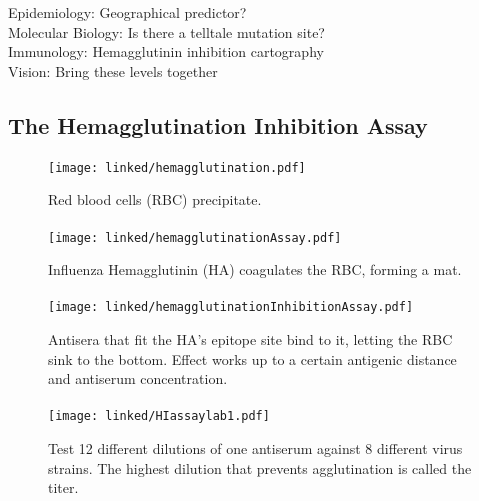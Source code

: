 \documentclass{beamer}
\begin{document}
\begin{darkframes}
\begin{frame}{\secname}

      \vfill
      Epidemiology: Geographical predictor?\\[2mm]

      Molecular Biology: Is there a telltale mutation site?\\[2mm]

      Immunology: Hemagglutinin inhibition cartography\\[2mm]

      \Large Vision: Bring these levels together
    \end{frame}




    \subsection{The Hemagglutination Inhibition Assay}

    \begin{frame}{\subsecname}
      \framesubtitle{}
      \begin{figure}
        \texttt{[image: linked/hemagglutination.pdf]}
        \caption{Red blood cells (RBC) precipitate.}
        \label{1}
      \end{figure}
    \end{frame}

    \begin{frame}{\subsecname}
      \framesubtitle{}
      \begin{figure}
        \texttt{[image: linked/hemagglutinationAssay.pdf]}
        \caption{Influenza Hemagglutinin (HA) coagulates the RBC, forming a mat.}
      \end{figure}
    \end{frame}

    \begin{frame}{\subsecname}
      \framesubtitle{}
      \begin{figure}
        \texttt{[image: linked/hemagglutinationInhibitionAssay.pdf]}
        \caption{Antisera that fit the HA's epitope site bind to it, letting the RBC sink to the bottom. Effect works up to a certain antigenic distance and antiserum concentration.}
      \end{figure}
    \end{frame}

    \begin{frame}{\subsecname}
      \framesubtitle{}
      \begin{figure}
        \texttt{[image: linked/HIassaylab1.pdf]}
        \caption{\footnotesize Test 12 different dilutions of one antiserum against 8 different virus strains. The highest dilution that prevents agglutination is called the titer.}
      \end{figure}
    \end{frame}


\end{darkframes}
\end{document}
